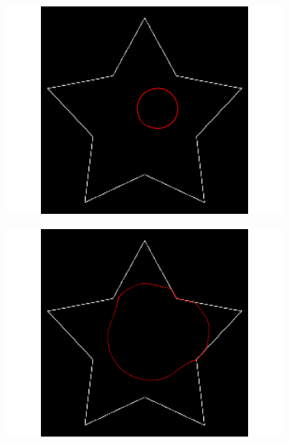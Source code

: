\begin{figure}[H]
\begin{subfigure}[c]{0.3\linewidth}
\centering
\includegraphics[width=\textwidth]{Chapters/Images/Init/vfccs1}
\caption{}
\end{subfigure}
\begin{subfigure}[c]{0.3\linewidth}
\centering
\includegraphics[width=\textwidth]{Chapters/Images/Init/vfccs2}
\caption{}
\end{subfigure}
\begin{subfigure}[c]{0.3\linewidth}
\centering

\end{subfigure}
\end{figure}
